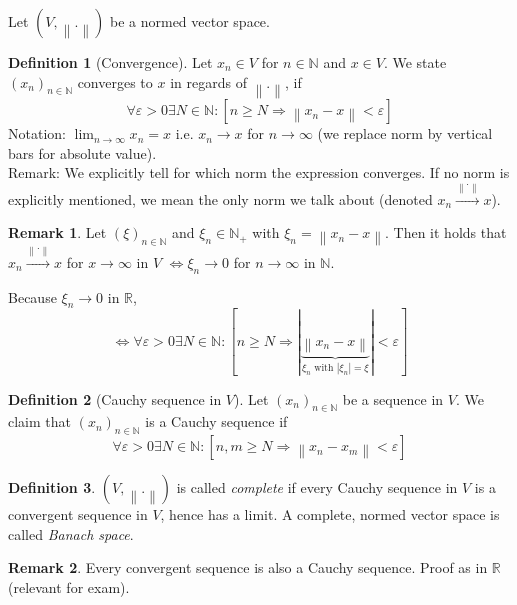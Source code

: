 \documentclass[a4paper,landscape,twocolumn]{article}
\theoremstyle{definition}
\newtheorem{defi}{Definition}
\newtheorem{rem}{Remark}
\newcommand\abs[1]{\left|#1\right|}
\newcommand\norm[1]{\left\|#1\right\|}
\begin{document}
Let $(V, \norm{.})$ be a normed vector space.

\begin{defi}[Convergence]
  Let $x_n \in V$ for $n \in \mathbb N$ and $x \in V$.
  We state $(x_n)_{n\in\mathbb N}$ converges to $x$ in regards of $\norm{.}$, if
  \[ \forall \varepsilon > 0 \exists N \in \mathbb N: [n \geq N \Rightarrow \norm{x_n - x} < \varepsilon] \]
  Notation: $\lim_{n\to\infty} x_n = x$ i.e. $x_n \to x$ for $n \to \infty$ (we replace norm by vertical bars for absolute value). \\
  Remark: We explicitly tell for which norm the expression converges. If no norm is explicitly mentioned, we mean the only norm we talk about (denoted $x_n \overset{\norm{.}}{\to} x$).
\end{defi}

\begin{rem}
  Let $(\xi)_{n\in\mathbb N}$ and $\xi_n \in \mathbb N_+$ with $\xi_n = \norm{x_n - x}$.
  Then it holds that $x_n \overset{\norm{.}}{\to} x$ for $x \to \infty$ in $V$
  $\Leftrightarrow \xi_n \to 0$ for $n \to \infty$ in $\mathbb N$.

  Because $\xi_n \to 0$ in $\mathbb R$,
  \[ \Leftrightarrow \forall \varepsilon > 0 \exists N \in \mathbb N: [n \geq N \Rightarrow \abs{\underbrace{\norm{x_n - x}}_{\xi_n \text{ with } \abs{\xi_n} = \xi}} < \varepsilon] \]
\end{rem}

\begin{defi}[Cauchy sequence in $V$]
  Let $(x_n)_{n\in\mathbb N}$ be a sequence in $V$. We claim that
  $(x_n)_{n\in\mathbb N}$ is a Cauchy sequence if
  \[ \forall \varepsilon > 0 \exists N \in \mathbb N: [n,m \geq N \Rightarrow \norm{x_n - x_m} < \varepsilon] \]
\end{defi}

\begin{defi}
  $(V, \norm{.})$ is called \emph{complete} if every Cauchy sequence in $V$ is a convergent sequence in $V$,
  hence has a limit. A complete, normed vector space is called \emph{Banach space}.

\end{defi}

\begin{rem}
  Every convergent sequence is also a Cauchy sequence. Proof as in $\mathbb R$ (relevant for exam).
\end{rem}
\end{document}
